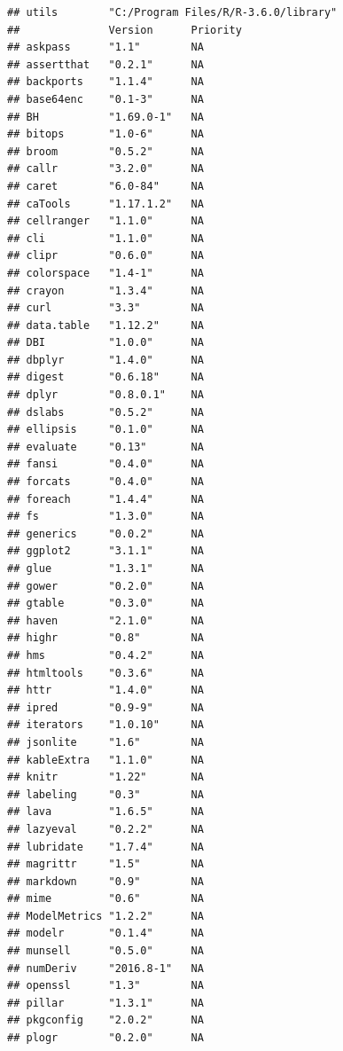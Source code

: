 \documentclass[]{article}
\begin{document}
\begin{verbatim}
## utils        "C:/Program Files/R/R-3.6.0/library"                 
##              Version      Priority     
## askpass      "1.1"        NA           
## assertthat   "0.2.1"      NA           
## backports    "1.1.4"      NA           
## base64enc    "0.1-3"      NA           
## BH           "1.69.0-1"   NA           
## bitops       "1.0-6"      NA           
## broom        "0.5.2"      NA           
## callr        "3.2.0"      NA           
## caret        "6.0-84"     NA           
## caTools      "1.17.1.2"   NA           
## cellranger   "1.1.0"      NA           
## cli          "1.1.0"      NA           
## clipr        "0.6.0"      NA           
## colorspace   "1.4-1"      NA           
## crayon       "1.3.4"      NA           
## curl         "3.3"        NA           
## data.table   "1.12.2"     NA           
## DBI          "1.0.0"      NA           
## dbplyr       "1.4.0"      NA           
## digest       "0.6.18"     NA           
## dplyr        "0.8.0.1"    NA           
## dslabs       "0.5.2"      NA           
## ellipsis     "0.1.0"      NA           
## evaluate     "0.13"       NA           
## fansi        "0.4.0"      NA           
## forcats      "0.4.0"      NA           
## foreach      "1.4.4"      NA           
## fs           "1.3.0"      NA           
## generics     "0.0.2"      NA           
## ggplot2      "3.1.1"      NA           
## glue         "1.3.1"      NA           
## gower        "0.2.0"      NA           
## gtable       "0.3.0"      NA           
## haven        "2.1.0"      NA           
## highr        "0.8"        NA           
## hms          "0.4.2"      NA           
## htmltools    "0.3.6"      NA           
## httr         "1.4.0"      NA           
## ipred        "0.9-9"      NA           
## iterators    "1.0.10"     NA           
## jsonlite     "1.6"        NA           
## kableExtra   "1.1.0"      NA           
## knitr        "1.22"       NA           
## labeling     "0.3"        NA           
## lava         "1.6.5"      NA           
## lazyeval     "0.2.2"      NA           
## lubridate    "1.7.4"      NA           
## magrittr     "1.5"        NA           
## markdown     "0.9"        NA           
## mime         "0.6"        NA           
## ModelMetrics "1.2.2"      NA           
## modelr       "0.1.4"      NA           
## munsell      "0.5.0"      NA           
## numDeriv     "2016.8-1"   NA           
## openssl      "1.3"        NA           
## pillar       "1.3.1"      NA           
## pkgconfig    "2.0.2"      NA           
## plogr        "0.2.0"      NA           

\end{verbatim}
\end{document}
